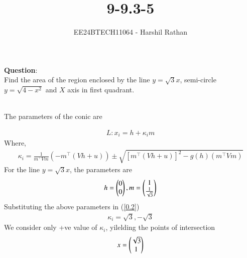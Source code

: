 \documentclass[journal]{IEEEtran}
\begin{document}

\vspace{3cm}

\title{9-9.3-5}
\author{EE24BTECH11064 - Harshil Rathan}
{\let\newpage\relax\maketitle}

\renewcommand{\thefigure}{\theenumi}
\renewcommand{\thetable}{\theenumi}
\setlength{\intextsep}{10pt} %


\renewcommand{\thetable}{\theenumi}
\textbf{Question}:\\
Find the area of the region enclosed by the line $y=\sqrt{3}x$, semi-circle $y=\sqrt{4-x^2}$ and $X$ axis in first quadrant.\\
\solution \\
\begin{table}[h!]
    \centering
    
\end{table}
The parameters of the conic are\\
\begin{table}[h!]
    \centering
    
    \label{Table2}
\end{table}
\begin{align}
    L : x_i=h+\kappa_i m 
\end{align}
Where,
\begin{align}
    \kappa_i=\frac{1}{m^\top Vm}(-m^\top(Vh+u)) \pm \sqrt{[m^\top(Vh+u)]^2-g(h)(m^\top Vm)}
    \label{0.2}
\end{align}
For the line $y=\sqrt{3}x$, the parameters are\\
\begin{align}    
    h=\begin{pmatrix}0\\0\end{pmatrix} , m=\begin{pmatrix}1\\ \frac{1}{\sqrt{3}}\end{pmatrix}
\end{align}
Substituting the above parameters in (\ref{0.2})\\
\begin{align}
    \kappa_i= \sqrt{3},-\sqrt{3}
\end{align}
We consider only +ve value of $\kappa_i$, yilelding the points of intersection\\
\begin{align}
  x=\begin{pmatrix}\sqrt{3} \\ 1\end{pmatrix}
\end{align}
\end{document}
